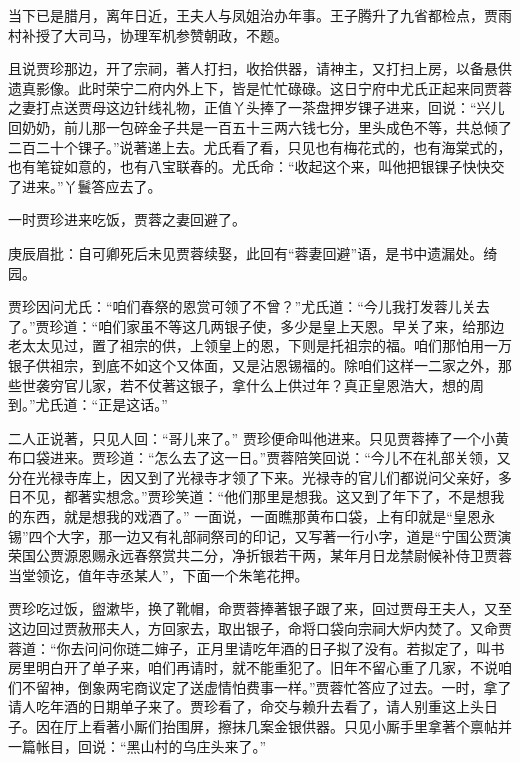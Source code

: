 \begin{parag}


    当下已是腊月，离年日近，王夫人与凤姐治办年事。王子腾升了九省都检点，贾雨村补授了大司马，协理军机参赞朝政，不题。
\end{parag}


\begin{parag}


    且说贾珍那边，开了宗祠，著人打扫，收拾供器，请神主，又打扫上房，以备悬供遗真影像。此时荣宁二府内外上下，皆是忙忙碌碌。这日宁府中尤氏正起来同贾蓉之妻打点送贾母这边针线礼物，正值丫头捧了一茶盘押岁锞子进来，回说：“兴儿回奶奶，前儿那一包碎金子共是一百五十三两六钱七分，里头成色不等，共总倾了二百二十个锞子。”说著递上去。尤氏看了看，只见也有梅花式的，也有海棠式的，也有笔锭如意的，也有八宝联春的。尤氏命：“收起这个来，叫他把银锞子快快交了进来。”丫鬟答应去了。
\end{parag}


\begin{parag}


    一时贾珍进来吃饭，贾蓉之妻回避了。\begin{note}庚辰眉批：自可卿死后未见贾蓉续娶，此回有“蓉妻回避”语，是书中遗漏处。绮园。\end{note}贾珍因问尤氏：“咱们春祭的恩赏可领了不曾？”尤氏道：“今儿我打发蓉儿关去了。”贾珍道：“咱们家虽不等这几两银子使，多少是皇上天恩。早关了来，给那边老太太见过，置了祖宗的供，上领皇上的恩，下则是托祖宗的福。咱们那怕用一万银子供祖宗，到底不如这个又体面，又是沾恩锡福的。除咱们这样一二家之外，那些世袭穷官儿家，若不仗著这银子，拿什么上供过年？真正皇恩浩大，想的周到。”尤氏道：“正是这话。”
\end{parag}


\begin{parag}


    二人正说著，只见人回：“哥儿来了。” 贾珍便命叫他进来。只见贾蓉捧了一个小黄布口袋进来。贾珍道：“怎么去了这一日。”贾蓉陪笑回说：“今儿不在礼部关领，又分在光禄寺库上，因又到了光禄寺才领了下来。光禄寺的官儿们都说问父亲好，多日不见，都著实想念。”贾珍笑道：“他们那里是想我。这又到了年下了，不是想我的东西，就是想我的戏酒了。” 一面说，一面瞧那黄布口袋，上有印就是“皇恩永锡”四个大字，那一边又有礼部祠祭司的印记，又写著一行小字，道是“宁国公贾演荣国公贾源恩赐永远春祭赏共二分，净折银若干两，某年月日龙禁尉候补侍卫贾蓉当堂领讫，值年寺丞某人”，下面一个朱笔花押。
\end{parag}


\begin{parag}


    贾珍吃过饭，盥漱毕，换了靴帽，命贾蓉捧著银子跟了来，回过贾母王夫人，又至这边回过贾赦邢夫人，方回家去，取出银子，命将口袋向宗祠大炉内焚了。又命贾蓉道：“你去问问你琏二婶子，正月里请吃年酒的日子拟了没有。若拟定了，叫书房里明白开了单子来，咱们再请时，就不能重犯了。旧年不留心重了几家，不说咱们不留神，倒象两宅商议定了送虚情怕费事一样。”贾蓉忙答应了过去。一时，拿了请人吃年酒的日期单子来了。贾珍看了，命交与赖升去看了，请人别重这上头日子。因在厅上看著小厮们抬围屏，擦抹几案金银供器。只见小厮手里拿著个禀帖并一篇帐目，回说：“黑山村的乌庄头来了。”
\end{parag}


